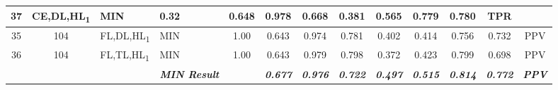 \begin{table}[H]
{\begin{tabular}{ccl|l|c|c|c|c|c|c|c|c|c|}
    \multicolumn{1}{c|}{37} &
    CE,DL,HL\textsubscript{1} &
    MIN &
    0.32 &
    0.648 &
    0.978 &
    0.668 &
    0.381 &
    0.565 &
    0.779 &
    0.780 &
    TPR \\ \hline
  \multicolumn{1}{|c|}{35} &
    \multicolumn{1}{c|}{104} &
    FL,DL,HL\textsubscript{1} &
    MIN &
    1.00 &
    0.643 &
    0.974 &
    0.781 &
    0.402 &
    0.414 &
    0.756 &
    0.732 &
    PPV \\ \hline
  \multicolumn{1}{|c|}{36} &
    \multicolumn{1}{c|}{104} &
    FL,TL,HL\textsubscript{1} &
    MIN &
    1.00 &
    0.643 &
    0.979 &
    0.798 &
    0.372 &
    0.423 &
    0.799 &
    0.698 &
    PPV \\ \hline
   &
    \textit{\textbf{}} &
     &
    \textit{\textbf{MIN Result}} &
     &
    \textit{\textbf{0.677}} &
    \textit{\textbf{0.976}} &
    \textit{\textbf{0.722}} &
    \textit{\textbf{0.497}} &
    \textit{\textbf{0.515}} &
    \textit{\textbf{0.814}} &
    \textit{\textbf{0.772}} &
    \textit{\textbf{PPV}} \\ \cline{4-4} \cline{6-13} 
  \end{tabular}%
  }
  \end{table}
